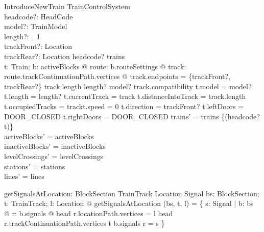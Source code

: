 \begin{schema}{IntroduceNewTrain}
  \Delta TrainControlSystem\\
  headcode?: HeadCode\\
  model?: TrainModel\\
  length?: \nat _1{}\\
  trackFront?: Location\\
  trackRear?: Location
\where
  headcode? \notin  \dom  trains\\
  \exists  t: Train; b: \ran  activeBlocks @ \exists  route: b.routeSettings @ \exists  track: \ran  route.trackContinuationPath.vertices @ track.endpoints = \{trackFront?, trackRear?\} \land  track.length \geq  length? \land  model? \in  track.compatibility \land  t.model = model? \land  t.length = length? \land  t.currentTrack = track \land  t.distanceIntoTrack = track.length \land  t.occupiedTracks = \langle track\rangle  \land  t.speed = 0 \land  t.direction = trackFront? \land  t.leftDoors = DOOR\_CLOSED \land  t.rightDoors = DOOR\_CLOSED \land  trains' = trains \oplus  \{(headcode? \mapsto  t)\}\\
  activeBlocks' = activeBlocks\\
  inactiveBlocks' = inactiveBlocks\\
  levelCrossings' = levelCrossings\\
  stations' = stations\\
  lines' = lines
\end{schema}

\begin{axdef}
  getSignalsAtLocation: \finset  BlockSection \cross  TrainTrack \cross  Location \fun  \finset  Signal
\where
  \forall  bs: \finset  BlockSection; t: TrainTrack; l: Location @ getSignalsAtLocation (bs, t, l) = \{  s: Signal | \exists  b: bs @ \exists  r: \dom  b.signals @ head r.locationPath.vertices = l \land  head r.trackContinuationPath.vertices \neq  t \land  b.signals r = s \}
\end{axdef}

